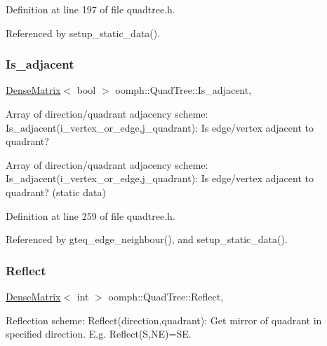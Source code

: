 Definition at line 197 of file quadtree.\+h.



Referenced by setup\+\_\+static\+\_\+data().

\mbox{\label{classoomph_1_1QuadTree_abb32869f7b5df6755d092183d6f1172e}} 
\subsubsection{\texorpdfstring{Is\+\_\+adjacent}{Is\_adjacent}}
{\footnotesize\ttfamily \hyperlink{classoomph_1_1DenseMatrix}{Dense\+Matrix}$<$ bool $>$ oomph\+::\+Quad\+Tree\+::\+Is\+\_\+adjacent\hspace{0.3cm}{\ttfamily [static]}, {\ttfamily [private]}}



Array of direction/quadrant adjacency scheme\+: Is\+\_\+adjacent(i\+\_\+vertex\+\_\+or\+\_\+edge,j\+\_\+quadrant)\+: Is edge/vertex adjacent to quadrant? 

Array of direction/quadrant adjacency scheme\+: Is\+\_\+adjacent(i\+\_\+vertex\+\_\+or\+\_\+edge,j\+\_\+quadrant)\+: Is edge/vertex adjacent to quadrant? (static data) 

Definition at line 259 of file quadtree.\+h.



Referenced by gteq\+\_\+edge\+\_\+neighbour(), and setup\+\_\+static\+\_\+data().

\mbox{\label{classoomph_1_1QuadTree_a445a7130050bd7084f49acac8afc1530}} 
\subsubsection{\texorpdfstring{Reflect}{Reflect}}
{\footnotesize\ttfamily \hyperlink{classoomph_1_1DenseMatrix}{Dense\+Matrix}$<$ int $>$ oomph\+::\+Quad\+Tree\+::\+Reflect\hspace{0.3cm}{\ttfamily [static]}, {\ttfamily [private]}}



Reflection scheme\+: Reflect(direction,quadrant)\+: Get mirror of quadrant in specified direction. E.\+g. Reflect(\+S,\+N\+E)=SE. 

